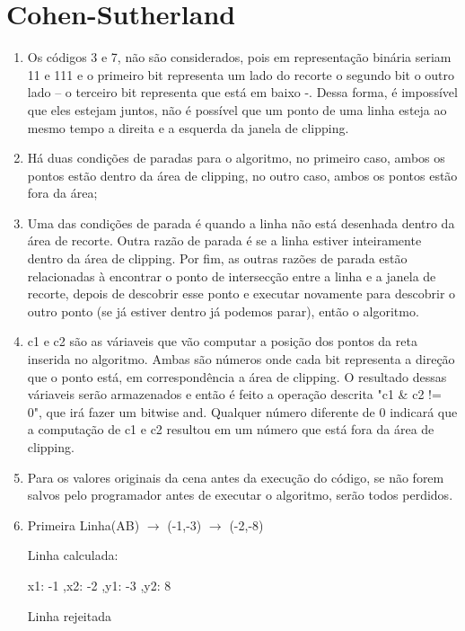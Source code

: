 \section*{Cohen-Sutherland}

	\begin{enumerate}\addtocounter{enumi}{21}
		\item 
Os códigos 3 e 7, não são considerados, pois em representação binária seriam 11 e
111 e o primeiro bit representa um lado do recorte o segundo bit o outro lado – o terceiro bit
representa que está em baixo -. Dessa forma, é impossível que eles estejam juntos, não é possível que um ponto de uma linha esteja ao mesmo tempo a direita e a esquerda da janela de clipping.		
		\item 
		Há duas condições de paradas para o algoritmo, no primeiro caso, ambos os pontos
		estão dentro da área de clipping, no outro caso, ambos os pontos estão fora da área;
		\item
Uma das condições de parada é quando a linha não está desenhada dentro da área de
recorte. Outra razão de parada é se a linha estiver inteiramente dentro da área de clipping. Por fim, as outras razões de parada estão relacionadas à encontrar o ponto de intersecção entre a linha e a janela de recorte, depois de descobrir esse ponto e executar novamente para descobrir o outro ponto (se já estiver dentro já podemos parar), então o algoritmo.
		\item 
		c1 e c2 são as váriaveis que vão computar a posição dos pontos da reta
		inserida no algoritmo. Ambas são números onde cada bit representa a direção
		 que o ponto está, em correspondência a área de clipping. O resultado dessas váriaveis
		 serão armazenados e então é feito a operação descrita "c1 \& c2 != 0", que irá fazer um 
		 bitwise and. Qualquer número diferente de 0 indicará que a computação de c1 e c2 resultou
		 em um número que está fora da área de clipping.
		
		\item 
		Para os valores originais da cena antes da execução do código, se não forem salvos
pelo programador antes de executar o algoritmo, serão todos perdidos.
		\item 

		Primeira Linha(AB) $\rightarrow$ (-1,-3) $\rightarrow$ (-2,-8)
		
		Linha calculada: 
		
		 x1: -1 ,x2: -2 ,y1: -3 ,y2: 8

		Linha rejeitada


\end{enumerate}
